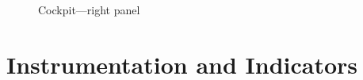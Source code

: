 \documentclass[a4paper]{report}
\begin{document}
\begin{figure}
  \caption{Cockpit---right panel}
  \label{fig:right-panel}
\end{figure}


\newcommand{\cockpitref}[2]{\hyperref[#2]{fig~\labelcref*{#1}:\labelcref*{#2}}}

\chapter{Instrumentation and Indicators}

\newcommand{\sidepicture}[2]{%
  \noindent
  \begin{minipage}[t]{0.7\textwidth}
    \vspace{0pt}
    \setlength{\parindent}{1em}
    #1
  \end{minipage}
  \hspace{0.1\textwidth}
  \begin{minipage}[t]{0.2\textwidth}
    \vspace{0pt}
    \centering
    #2
  \end{minipage}
}
\end{document}

